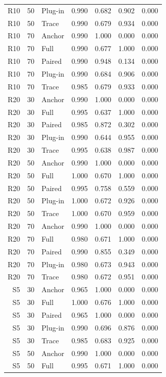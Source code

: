 \begin{longtable}{rrlrrrr}
R10 & 50 & Plug-in & 0.990 & 0.682 & 0.902 & 0.000\\
R10 & 50 & Trace & 0.990 & 0.679 & 0.934 & 0.000\\
R10 & 70 & Anchor & 0.990 & 1.000 & 0.000 & 0.000\\
R10 & 70 & Full & 0.990 & 0.677 & 1.000 & 0.000\\
R10 & 70 & Paired & 0.990 & 0.948 & 0.134 & 0.000\\
R10 & 70 & Plug-in & 0.990 & 0.684 & 0.906 & 0.000\\
R10 & 70 & Trace & 0.985 & 0.679 & 0.933 & 0.000\\
R20 & 30 & Anchor & 0.990 & 1.000 & 0.000 & 0.000\\
R20 & 30 & Full & 0.995 & 0.637 & 1.000 & 0.000\\
R20 & 30 & Paired & 0.985 & 0.872 & 0.302 & 0.000\\
R20 & 30 & Plug-in & 0.990 & 0.644 & 0.955 & 0.000\\
R20 & 30 & Trace & 0.995 & 0.638 & 0.987 & 0.000\\
R20 & 50 & Anchor & 0.990 & 1.000 & 0.000 & 0.000\\
R20 & 50 & Full & 1.000 & 0.670 & 1.000 & 0.000\\
R20 & 50 & Paired & 0.995 & 0.758 & 0.559 & 0.000\\
R20 & 50 & Plug-in & 1.000 & 0.672 & 0.926 & 0.000\\
R20 & 50 & Trace & 1.000 & 0.670 & 0.959 & 0.000\\
R20 & 70 & Anchor & 0.990 & 1.000 & 0.000 & 0.000\\
R20 & 70 & Full & 0.980 & 0.671 & 1.000 & 0.000\\
R20 & 70 & Paired & 0.990 & 0.855 & 0.349 & 0.000\\
R20 & 70 & Plug-in & 0.980 & 0.673 & 0.943 & 0.000\\
R20 & 70 & Trace & 0.980 & 0.672 & 0.951 & 0.000\\
S5 & 30 & Anchor & 0.965 & 1.000 & 0.000 & 0.000\\
S5 & 30 & Full & 1.000 & 0.676 & 1.000 & 0.000\\
S5 & 30 & Paired & 0.965 & 1.000 & 0.000 & 0.000\\
S5 & 30 & Plug-in & 0.990 & 0.696 & 0.876 & 0.000\\
S5 & 30 & Trace & 0.985 & 0.683 & 0.925 & 0.000\\
S5 & 50 & Anchor & 0.990 & 1.000 & 0.000 & 0.000\\
S5 & 50 & Full & 0.995 & 0.671 & 1.000 & 0.000\\

\end{longtable}
